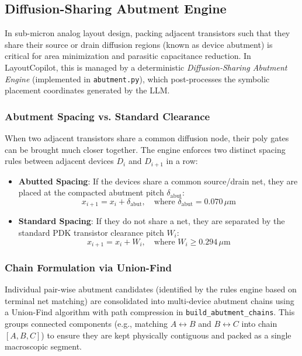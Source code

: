 \subsection{Diffusion-Sharing Abutment Engine}
In sub-micron analog layout design, packing adjacent transistors such that they share their source or drain diffusion regions (known as device abutment) is critical for area minimization and parasitic capacitance reduction. In LayoutCopilot, this is managed by a deterministic \emph{Diffusion-Sharing Abutment Engine} (implemented in \texttt{abutment.py}), which post-processes the symbolic placement coordinates generated by the LLM.

\subsubsection{Abutment Spacing vs. Standard Clearance}
When two adjacent transistors share a common diffusion node, their poly gates can be brought much closer together. The engine enforces two distinct spacing rules between adjacent devices $D_i$ and $D_{i+1}$ in a row:
\begin{itemize}
    \item \textbf{Abutted Spacing}: If the devices share a common source/drain net, they are placed at the compacted abutment pitch $\delta_{\text{abut}}$:
    \begin{equation}
        x_{i+1} = x_i + \delta_{\text{abut}}, \quad \text{where } \delta_{\text{abut}} = 0.070\,\mu\text{m}
    \end{equation}
    \item \textbf{Standard Spacing}: If they do not share a net, they are separated by the standard PDK transistor clearance pitch $W_i$:
    \begin{equation}
        x_{i+1} = x_i + W_i, \quad \text{where } W_i \ge 0.294\,\mu\text{m}
    \end{equation}
\end{itemize}

\subsubsection{Chain Formulation via Union-Find}
Individual pair-wise abutment candidates (identified by the rules engine based on terminal net matching) are consolidated into multi-device abutment chains using a Union-Find algorithm with path compression in \texttt{build\_}\allowbreak\texttt{abutment\_}\allowbreak\texttt{chains}. This groups connected components (e.g., matching $A \leftrightarrow B$ and $B \leftrightarrow C$ into chain $[A, B, C]$) to ensure they are kept physically contiguous and packed as a single macroscopic segment.

